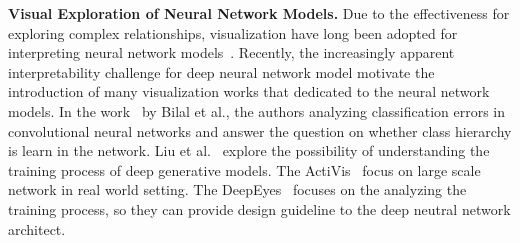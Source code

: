 \noindent\textbf{Visual Exploration of Neural Network Models.}
Due to the effectiveness for exploring complex relationships, visualization have long been adopted for interpreting neural network models~\cite{TzengMa2005}.
Recently, the increasingly apparent interpretability challenge for deep neural network model motivate the introduction of many visualization works that dedicated to the neural network models.
In the work~\cite{BilalJourablooYe2018} by Bilal et al., the authors analyzing classification errors in convolutional neural networks and answer the question on whether class hierarchy is learn in the network.
Liu et al.~\cite{LiuShiCao2018} explore the possibility of understanding the training process of deep generative models.
The ActiVis~\cite{KahngAndrewsKalro2018} focus on large scale network in real world setting.
The DeepEyes~\cite{Pezzotti2018} focuses on the analyzing the training process, so they can provide design guideline to the deep neutral network architect.


